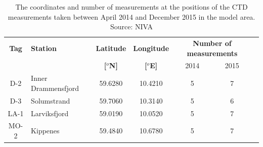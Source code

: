\begin{table}
\caption{The coordinates and number of measurements at the positions of the CTD measurements taken between April 2014 and December 2015 in the model area. Source: NIVA} 
\label{tab:CTD_pos} 
\centering 
\begin{tabular}{|clcccc@{}c|} 
\hline  
{\bf Tag} & {\bf Station} & {\bf Latitude} & {\bf Longitude} & \multicolumn{2}{c}{\bf Number of measurements} &\\ 
&& {\bf [$^o$N]} & {\bf [$^o$E]} & 2014 & 2015 &\\ \hline
D-2 & Inner Drammensfjord & 59.6280 & 10.4210 & 5 & 7 &\\ 
D-3 & Solumstrand & 59.7060 & 10.3140 & 5 & 6 &\\ \hline
LA-1 & Larviksfjord & 59.0190 & 10.0520 & 5 & 7 &\\ 
MO-2 & Kippenes & 59.4840 & 10.6780 & 5 & 7 &\\ \hline

\end{tabular}
\end{table}
